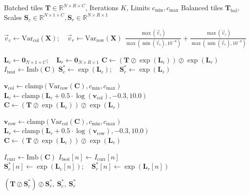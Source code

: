 \documentclass{article}
\begin{document}
\begin{algorithm}[t]
\small
\caption{VarN, Variance-Normalization by Alternating Log-Domain Dual-Scale Balancing}
\label{alg:sinq}
\begin{algorithmic}[1]
\Require Batched tiles $\mathbf{T} \in \mathbb{R}^{N \times R \times C}$, Iterations $K$, Limits $c_\text{min}, c_\text{max}$
\Ensure Balanced tiles $\mathbf{T}_{\text{bal}}$, Scales $\mathbf{S}_c \in \mathbb{R}^{N \times 1 \times C}, \mathbf{S}_r \in \mathbb{R}^{N \times R \times 1}$

    \State $\vec{v}_c \gets \text{Var}_{\text{col}}(\mathbf{X}); \quad \vec{v}_r \gets \text{Var}_{\text{row}}(\mathbf{X})$ 
    \State \Return $\frac{\max(\vec{v}_c)}{\max(\min(\vec{v}_c), 10^{-8})} + \frac{\max(\vec{v}_r)}{\max(\min(\vec{v}_r), 10^{-8})}$
\EndFunction
\vspace{0.1cm}

\State $\mathbf{L}_c \gets \mathbf{0}_{N \times 1 \times C} ; \quad \mathbf{L}_r \gets \mathbf{0}_{N \times R \times 1}$ 
\State $\mathbf{C} \gets (\mathbf{T} \oslash \exp(\mathbf{L}_c)) \oslash \exp(\mathbf{L}_r)$ 
\State $I_{\text{best}} \gets \text{Imb}(\mathbf{C})$
\State $\mathbf{S}_c^* \gets \exp(\mathbf{L}_c) ; \quad \mathbf{S}_r^* \gets \exp(\mathbf{L}_r)$ 

    \State $\mathbf{v}_{\text{col}} \gets \text{clamp}(\text{Var}_\text{row}(\mathbf{C}), c_\text{min}, c_\text{max})$
    \State $\mathbf{L}_c \gets \text{clamp}(\mathbf{L}_c + 0.5 \cdot \log(\mathbf{v}_{\text{col}}), -0.3, 10.0)$
    \State $\mathbf{C} \gets (\mathbf{T} \oslash \exp(\mathbf{L}_c)) \oslash \exp(\mathbf{L}_r)$
    
    \State $\mathbf{v}_{\text{row}} \gets \text{clamp}(\text{Var}_\text{col}(\mathbf{C}), c_\text{min}, c_\text{max})$
    \State $\mathbf{L}_r \gets \text{clamp}(\mathbf{L}_r + 0.5 \cdot \log(\mathbf{v}_{\text{row}}), -0.3, 10.0)$
    \State $\mathbf{C} \gets (\mathbf{T} \oslash \exp(\mathbf{L}_c)) \oslash \exp(\mathbf{L}_r)$
    
    \State $I_{\text{curr}} \gets \text{Imb}(\mathbf{C})$
     
            \State $I_{\text{best}}[n] \gets I_{\text{curr}}[n]$
            \State $\mathbf{S}_c^*[n] \gets \exp(\mathbf{L}_c[n]) ; \quad \mathbf{S}_r^*[n] \gets \exp(\mathbf{L}_r[n])$
        \EndIf
    \EndFor
\EndFor

\State \Return $(\mathbf{T} \oslash \mathbf{S}_c^*) \oslash \mathbf{S}_r^*, ~ \mathbf{S}_c^*, ~ \mathbf{S}_r^*$ 
\end{algorithmic}
\end{algorithm}
\end{document}
